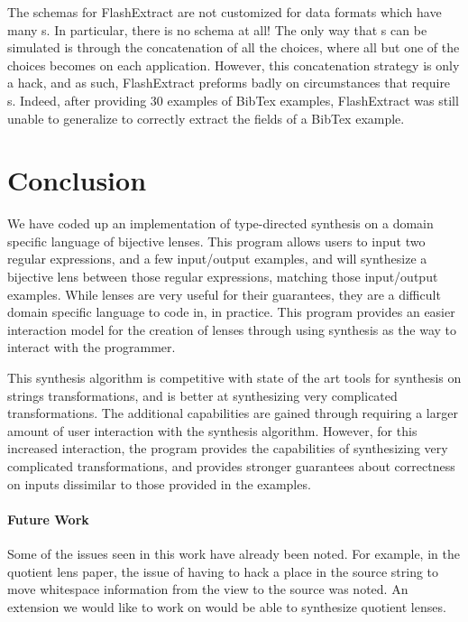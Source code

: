 \documentclass[numbers,10pt,preprint\ifanon ,nocopyrightspace\fi]{sigplanconf}
\begin{document}
The schemas for FlashExtract are not customized for data formats which have many
\OrRegexType{}s.  In particular, there is no \OrRegexType{} schema at all!  The
only way that \OrRegexType{}s can be simulated is through the concatenation of
all the choices, where all but one of the choices becomes  on each
application.  However, this concatenation strategy is only a hack, and as such,
FlashExtract preforms badly on
circumstances that require \OrRegexType{}s.
Indeed, after providing 30 examples of BibTex
examples, FlashExtract was still unable to generalize to correctly extract
the fields of a BibTex example.

\section{Conclusion}

We have coded up an implementation of type-directed synthesis on a domain
specific language of bijective lenses.  This program allows users to input two
regular expressions, and a few input/output examples, and will synthesize a
bijective lens between those regular expressions, matching those input/output
examples.  While lenses are very useful for their guarantees, they are a
difficult domain specific language to code in, in practice.  This program
provides an easier interaction model for the creation of lenses through using
synthesis as the way to interact with the programmer.

This synthesis algorithm is competitive with state of the art tools for
synthesis on strings transformations, and is better at synthesizing very
complicated transformations.  The additional capabilities are gained through requiring a
larger amount of user interaction with the synthesis algorithm.  However,
for this increased interaction, the program provides the capabilities of
synthesizing very complicated transformations, and provides stronger guarantees
about correctness on inputs dissimilar to those provided in the examples.

\paragraph*{Future Work}
Some of the issues seen in this work have already been noted.  For example, in the
quotient lens paper, the issue of having to hack a place in the source string to
move whitespace information from the view to the source was noted.  An extension
we would like to work on would be able to synthesize quotient lenses.
\end{document}
